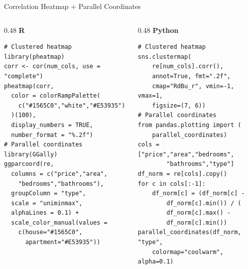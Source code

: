 \documentclass[10pt]{beamer}
\begin{document}
\begin{frame}[fragile]{Correlation Heatmap + Parallel Coordinates}
\begin{columns}[T]
\begin{column}{0.48\textwidth}
\textbf{R}
\begin{lstlisting}[style=rstyle]
# Clustered heatmap
library(pheatmap)
corr <- cor(num_cols, use = "complete")
pheatmap(corr,
  color = colorRampPalette(
    c("#1565C0","white","#E53935")
  )(100),
  display_numbers = TRUE,
  number_format = "%.2f")
# Parallel coordinates
library(GGally)
ggparcoord(re,
  columns = c("price","area",
    "bedrooms","bathrooms"),
  groupColumn = "type",
  scale = "uniminmax",
  alphaLines = 0.1) +
  scale_color_manual(values =
    c(house="#1565C0",
      apartment="#E53935"))
\end{lstlisting}
\end{column}
\begin{column}{0.48\textwidth}
\textbf{Python}
\begin{lstlisting}[style=pythonstyle]
# Clustered heatmap
sns.clustermap(
    re[num_cols].corr(),
    annot=True, fmt=".2f",
    cmap="RdBu_r", vmin=-1, vmax=1,
    figsize=(7, 6))
# Parallel coordinates
from pandas.plotting import (
    parallel_coordinates)
cols = ["price","area","bedrooms",
        "bathrooms","type"]
df_norm = re[cols].copy()
for c in cols[:-1]:
    df_norm[c] = (df_norm[c] -
        df_norm[c].min()) / (
        df_norm[c].max() -
        df_norm[c].min())
parallel_coordinates(df_norm, "type",
    colormap="coolwarm", alpha=0.1)
\end{lstlisting}
\end{column}
\end{columns}
\end{frame}
\end{document}
